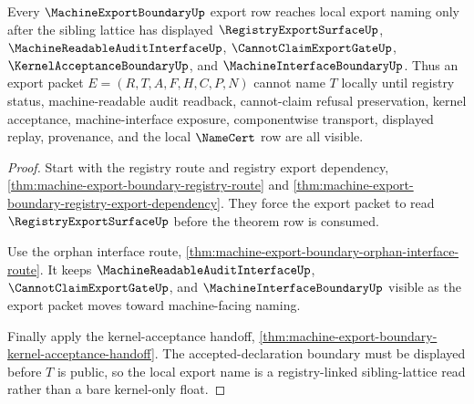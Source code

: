 \begin{theorem}
\label{thm:machine-export-boundary-registry-link}
Every $\MachineExportBoundaryUp$ export row reaches local export naming only after the sibling lattice has displayed $\RegistryExportSurfaceUp$, $\MachineReadableAuditInterfaceUp$, $\CannotClaimExportGateUp$, $\KernelAcceptanceBoundaryUp$, and $\MachineInterfaceBoundaryUp$. Thus an export packet $E=(R,T,A,F,H,C,P,N)$ cannot name $T$ locally until registry status, machine-readable audit readback, cannot-claim refusal preservation, kernel acceptance, machine-interface exposure, componentwise transport, displayed replay, provenance, and the local $\NameCert$ row are all visible.
\end{theorem}
\begin{proof}
Start with the registry route and registry export dependency, \autoref{thm:machine-export-boundary-registry-route} and \autoref{thm:machine-export-boundary-registry-export-dependency}. They force the export packet to read $\RegistryExportSurfaceUp$ before the theorem row is consumed.

Use the orphan interface route, \autoref{thm:machine-export-boundary-orphan-interface-route}. It keeps $\MachineReadableAuditInterfaceUp$, $\CannotClaimExportGateUp$, and $\MachineInterfaceBoundaryUp$ visible as the export packet moves toward machine-facing naming.

Finally apply the kernel-acceptance handoff, \autoref{thm:machine-export-boundary-kernel-acceptance-handoff}. The accepted-declaration boundary must be displayed before $T$ is public, so the local export name is a registry-linked sibling-lattice read rather than a bare kernel-only float.
\end{proof}
